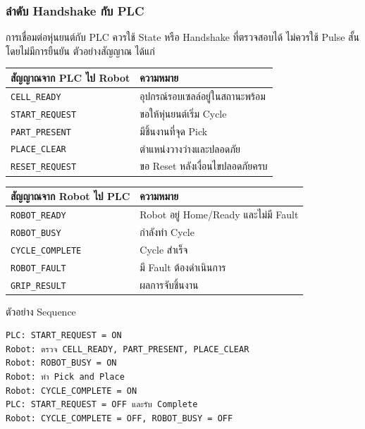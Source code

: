\subsubsection{ลำดับ Handshake กับ PLC}

การเชื่อมต่อหุ่นยนต์กับ PLC ควรใช้ State หรือ Handshake ที่ตรวจสอบได้ ไม่ควรใช้ Pulse สั้นโดยไม่มีการยืนยัน ตัวอย่างสัญญาณ ได้แก่

\begin{table}[htbp]
    \centering
    \begin{tabular}{l l}
        \hline
        \textbf{สัญญาณจาก PLC ไป Robot} & \textbf{ความหมาย} \\
        \hline
        \texttt{CELL\_READY} & อุปกรณ์รอบเซลล์อยู่ในสถานะพร้อม \\
        \texttt{START\_REQUEST} & ขอให้หุ่นยนต์เริ่ม Cycle \\
        \texttt{PART\_PRESENT} & มีชิ้นงานที่จุด Pick \\
        \texttt{PLACE\_CLEAR} & ตำแหน่งวางว่างและปลอดภัย \\
        \texttt{RESET\_REQUEST} & ขอ Reset หลังเงื่อนไขปลอดภัยครบ \\
        \hline
    \end{tabular}
\end{table}

\begin{table}[htbp]
    \centering
    \begin{tabular}{l l}
        \hline
        \textbf{สัญญาณจาก Robot ไป PLC} & \textbf{ความหมาย} \\
        \hline
        \texttt{ROBOT\_READY} & Robot อยู่ Home/Ready และไม่มี Fault \\
        \texttt{ROBOT\_BUSY} & กำลังทำ Cycle \\
        \texttt{CYCLE\_COMPLETE} & Cycle สำเร็จ \\
        \texttt{ROBOT\_FAULT} & มี Fault ต้องดำเนินการ \\
        \texttt{GRIP\_RESULT} & ผลการจับชิ้นงาน \\
        \hline
    \end{tabular}
\end{table}

ตัวอย่าง Sequence

\begin{verbatim}
PLC: START_REQUEST = ON
Robot: ตรวจ CELL_READY, PART_PRESENT, PLACE_CLEAR
Robot: ROBOT_BUSY = ON
Robot: ทำ Pick and Place
Robot: CYCLE_COMPLETE = ON
PLC: START_REQUEST = OFF และรับ Complete
Robot: CYCLE_COMPLETE = OFF, ROBOT_BUSY = OFF
\end{verbatim}

